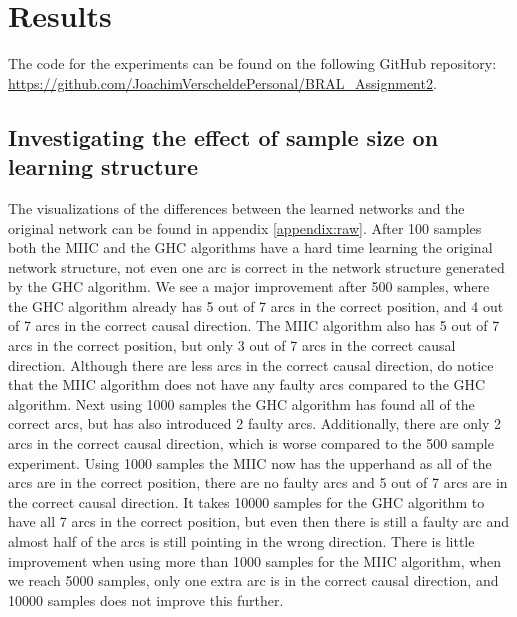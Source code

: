 \documentclass{article}
\begin{document}
\section{Results}
The code for the experiments can be found on the following GitHub repository: \url{https://github.com/JoachimVerscheldePersonal/BRAL_Assignment2}.
\subsection{Investigating the effect of sample size on learning structure}
The visualizations of the differences between the learned networks and the original network can be found in appendix \ref{appendix:raw}.
After 100 samples both the MIIC and the GHC algorithms have a hard time learning the original network structure, 
not even one arc is correct in the network structure generated by the GHC algorithm.
We see a major improvement after 500 samples, where the GHC algorithm already has 5 out of 7 arcs in the correct position, and 4 out of 7 arcs in the correct causal direction.
The MIIC algorithm also has 5 out of 7 arcs in the correct position, but only 3 out of 7 arcs in the correct causal direction. 
Although there are less arcs in the correct causal direction, do notice that the MIIC algorithm does not have any faulty arcs compared to the GHC algorithm.
Next using 1000 samples the GHC algorithm has found all of the correct arcs, but has also introduced 2 faulty arcs. Additionally, there are only 2 arcs in the correct causal direction, which is worse compared to the 500 sample experiment. 
Using 1000 samples the MIIC now has the upperhand as all of the arcs are in the correct position, there are no faulty arcs and 5 out of 7 arcs are in the correct causal direction.
It takes 10000 samples for the GHC algorithm to have all 7 arcs in the correct position, but even then there is still a faulty arc and almost half of the arcs is still pointing in the wrong direction.
There is little improvement when using more than 1000 samples for the MIIC algorithm, when we reach 5000 samples, only one extra arc is in the correct causal direction, and 10000 samples does not improve this further.
\end{document}
